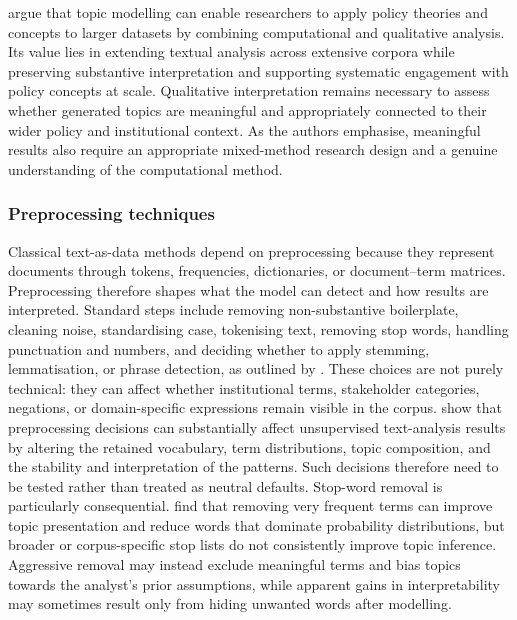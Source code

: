 \cite{isoaho2021topic} argue that topic modelling can enable researchers to apply
policy theories and concepts to larger datasets by combining computational and
qualitative analysis. Its value lies in extending textual analysis across extensive
corpora while preserving substantive interpretation and supporting systematic
engagement with policy concepts at scale. Qualitative interpretation remains
necessary to assess whether generated topics are meaningful and appropriately
connected to their wider policy and institutional context. As the authors emphasise,
meaningful results also require an appropriate mixed-method research design and a
genuine understanding of the computational method.

\subsubsection*{Preprocessing techniques}

Classical text-as-data methods depend on preprocessing because they represent
documents through tokens, frequencies, dictionaries, or document--term matrices.
Preprocessing therefore shapes what the model can detect and how results are
interpreted. Standard steps include removing non-substantive boilerplate, cleaning
noise, standardising case, tokenising text, removing stop words, handling punctuation
and numbers, and deciding whether to apply stemming, lemmatisation, or phrase
detection, as outlined by \cite{welbers2017text}. These choices are not purely
technical: they can affect whether institutional terms, stakeholder categories,
negations, or domain-specific expressions remain visible in the corpus.
\cite{denny2018preprocessing} show that preprocessing decisions can substantially
affect unsupervised text-analysis results by altering the retained vocabulary, term
distributions, topic composition, and the stability and interpretation of the
patterns. Such decisions therefore need to be tested rather than treated as neutral
defaults. Stop-word removal is particularly consequential.
\cite{schofield2017pulling} find that removing very frequent terms can improve topic
presentation and reduce words that dominate probability distributions, but broader or
corpus-specific stop lists do not consistently improve topic inference. Aggressive
removal may instead exclude meaningful terms and bias topics towards the analyst's
prior assumptions, while apparent gains in interpretability may sometimes result only
from hiding unwanted words after modelling.

